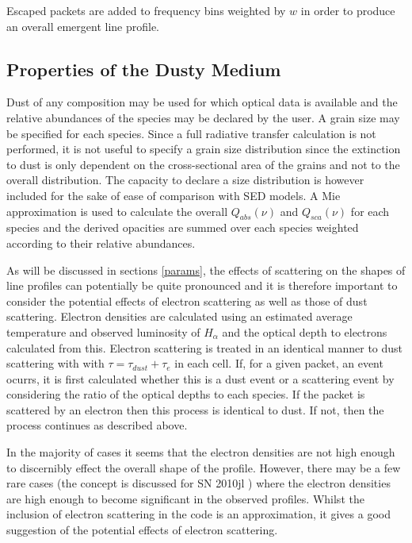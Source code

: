 \documentclass[useAMS,usenatbib,usegraphicx]{mnras}
\begin{document}
Escaped packets are added to frequency bins weighted by $w$ in order to 
produce an overall emergent line profile.


\subsection{Properties of the Dusty Medium}

Dust of any composition may be used for which optical data is available 
and the relative abundances of the species may be declared by the user.  
A grain size may be specified for each species.  Since a full radiative 
transfer calculation is not performed, it is not useful to specify a grain 
size distribution since the extinction to dust is only dependent on the 
cross-sectional area of the grains and not to the overall distribution.  
The capacity to declare a size distribution is however included for the 
sake of ease of comparison with SED models.  A Mie approximation is used 
to calculate the overall $Q_{abs}(\nu)$ and $Q_{sca}(\nu)$ for each 
species and the derived opacities are summed over each species weighted 
according to their relative abundances.


As will be discussed in sections \ref{params}, the effects of scattering 
on the shapes of line profiles can potentially be quite pronounced and it 
is therefore important to consider the potential effects of electron 
scattering as well as those of dust scattering.  Electron densities are 
calculated using an estimated average temperature and observed luminosity 
of $H_{\alpha}$ and the optical depth to electrons calculated from this.  
Electron scattering is treated in an identical manner to dust scattering 
with with $\tau = \tau_{dust}+\tau_{e}$ in each cell.  If, for a given 
packet, an event ocurrs, it is first calculated whether this is a dust 
event or a scattering event by considering the ratio of the optical depths 
to each species.  If the packet is scattered by an electron then this 
process is identical to dust.  If not, then the process continues as 
described above.

In the majority of cases it seems that the electron densities are not high 
enough to discernibly effect the overall shape of the profile.  However, 
there may be a few rare cases (the concept is discussed for SN 2010jl 
\citep{Fransson2013}) where the electron densities are high enough to 
become significant in the observed profiles.  Whilst the inclusion of 
electron scattering in the code is an approximation, it gives a good 
suggestion of the potential effects of electron scattering.
\end{document}
